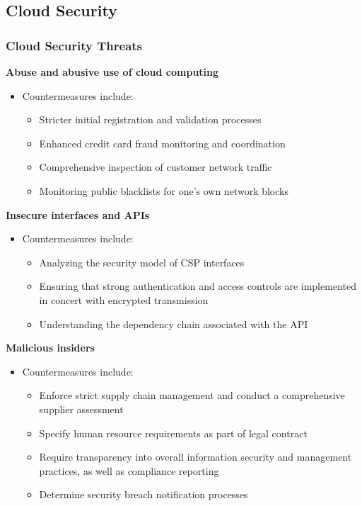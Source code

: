 \newpage

\subsection{Cloud Security}

\subsubsection{Cloud Security Threats}


\textbf{Abuse and abusive use of cloud computing}
\begin{itemize}
    \item Countermeasures include:
    \begin{itemize}
        \item Stricter initial registration and validation processes
        \item Enhanced credit card fraud monitoring and coordination
        \item Comprehensive inspection of customer network traffic
        \item Monitoring public blacklists for one's own network blocks\\
    \end{itemize}
\end{itemize}

\textbf{Insecure interfaces and APIs}
\begin{itemize}
    \item Countermeasures include:
    \begin{itemize}
        \item Analyzing the security model of CSP interfaces
        \item Ensuring that strong authentication and access controls are implemented in concert with encrypted transmission
        \item Understanding the dependency chain associated with the API\\
    \end{itemize}
\end{itemize}

\textbf{Malicious insiders}
\begin{itemize}
    \item Countermeasures include:
    \begin{itemize}
        \item Enforce strict supply chain management and conduct a comprehensive supplier assessment
        \item Specify human resource requirements as part of legal contract
        \item Require transparency into overall information security and management practices, as well as compliance reporting
        \item Determine security breach notification processes\\
    \end{itemize}
\end{itemize}


